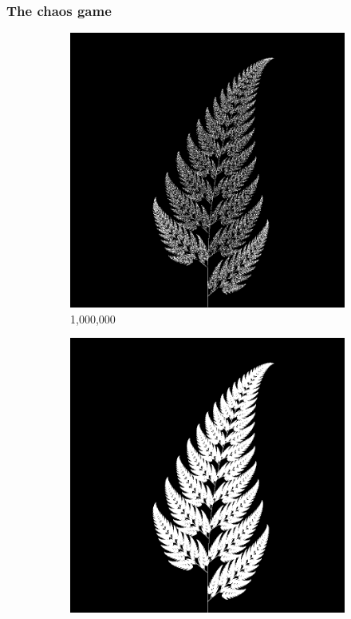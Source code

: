 \documentclass[11pt]{article}
\begin{document}
\subsubsection{The chaos game}
\label{sec:org3d53d73}
\label{subsection:chaos_game}

\begin{figure}
     \centering
     \begin{subfigure}[b]{0.4\textwidth}
         \centering
         \includegraphics[width=\textwidth]{figures/barnsley_1000000}
         \caption{1,000,000}
         \label{figure:barnsley_mil}
     \end{subfigure}
     \hfill
     \begin{subfigure}[b]{0.4\textwidth}
         \centering
         \includegraphics[width=\textwidth]{figures/barnsley_100000000}

\end{subfigure}
\end{figure}
\end{document}
